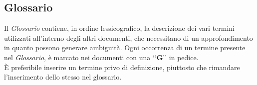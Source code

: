 \subsection{Glossario}
\label{glossario}
Il \emph{Glossario} contiene, in ordine lessicografico, la descrizione dei vari termini utilizzati all'interno degli altri documenti, che necessitano di un approfondimento in quanto possono generare ambiguità. Ogni occorrenza di un termine presente nel \emph{Glossario}, è marcato nei documenti con una \lq\lq{}\textbf{G}\rq\rq{} in pedice.
\\È preferibile inserire un termine privo di definizione, piuttosto che rimandare l’inserimento dello stesso nel glossario.